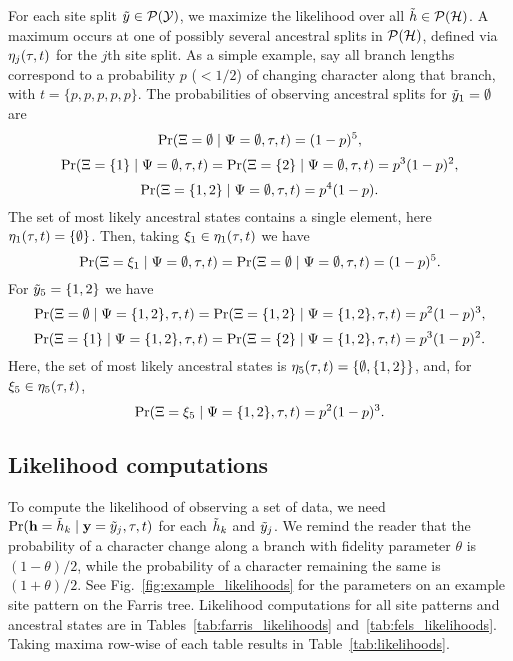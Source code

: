 For each site split $\tilde{y}\in\mathcal{P}(\mathcal{Y})$, we maximize the likelihood over all $\tilde{h}\in\mathcal{P}(\mathcal{H})$.
A maximum occurs at one of possibly several ancestral splits in $\mathcal{P}(\mathcal{H})$, defined via $\eta_j(\tau, t)$ for the $j$th site split.
As a simple example, say all branch lengths correspond to a probability $p$ ($< 1/2$) of changing character along that branch, with $t=\{p,p,p,p,p\}$.
The probabilities of observing ancestral splits for $\tilde{y}_1=\emptyset$ are
$$
\Pr(\Xi=\emptyset \mid \Psi=\emptyset, \tau, t) =
(1-p)^5,
$$
$$
\Pr(\Xi=\{1\} \mid \Psi=\emptyset, \tau, t) =
\Pr(\Xi=\{2\} \mid \Psi=\emptyset, \tau, t) =
p^3(1-p)^2,
$$
$$
\Pr(\Xi=\{1,2\} \mid \Psi=\emptyset, \tau, t) =
p^4(1-p).
$$
The set of most likely ancestral states contains a single element, here $\eta_1(\tau, t)=\{\emptyset\}$.
Then, taking $\xi_1\in\eta_1(\tau, t)$ we have
$$
\Pr(\Xi=\xi_1 \mid \Psi=\emptyset, \tau, t) =
\Pr(\Xi=\emptyset \mid \Psi=\emptyset, \tau, t) =
(1-p)^5.
$$
For $\tilde{y}_5=\{1,2\}$ we have
$$
\Pr(\Xi=\emptyset \mid \Psi=\{1,2\}, \tau, t) =
\Pr(\Xi=\{1,2\} \mid \Psi=\{1,2\}, \tau, t) =
p^2(1-p)^3,
$$
$$
\Pr(\Xi=\{1\} \mid \Psi=\{1,2\}, \tau, t) =
\Pr(\Xi=\{2\} \mid \Psi=\{1,2\}, \tau, t) =
p^3(1-p)^2.
$$
Here, the set of most likely ancestral states is $\eta_5(\tau, t)=\{\emptyset,\{1,2\}\}$, and, for $\xi_5\in\eta_5(\tau, t)$,
$$
\Pr(\Xi=\xi_5 \mid \Psi=\{1,2\}, \tau, t) =
p^2(1-p)^3.
$$

\subsection*{Likelihood computations}

To compute the likelihood of observing a set of data, we need $\Pr(\mathbf{h}=\tilde{h}_k\mid \mathbf{y}=\tilde{y}_j,\tau,t)$ for each $\tilde{h}_k$ and $\tilde{y}_j$.
We remind the reader that the probability of a character change along a branch with fidelity parameter $\theta$ is $(1-\theta)/2$, while the probability of a character remaining the same is $(1+\theta)/2$.
See Fig.~\ref{fig:example_likelihoods} for the parameters on an example site pattern on the Farris tree.
Likelihood computations for all site patterns and ancestral states are in Tables~\ref{tab:farris_likelihoods} and~\ref{tab:fels_likelihoods}.
Taking maxima row-wise of each table results in Table~\ref{tab:likelihoods}.


